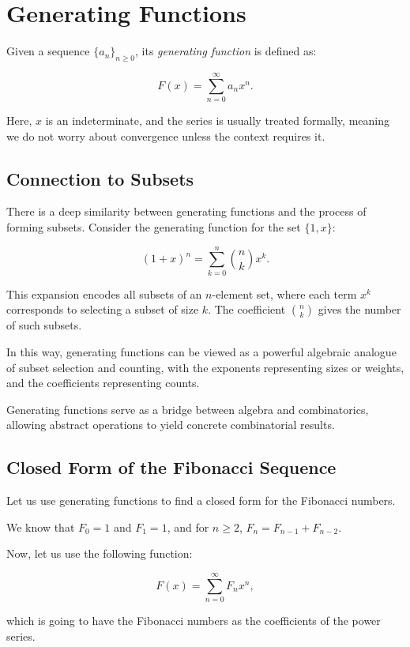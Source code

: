 \chapter{Generating Functions}

Given a sequence \( {\{a_n\}}_{n \ge 0} \), its \emph{generating function} is defined as:

\[
    F(x) = \sum_{n=0}^{\infty} a_n x^n.
\]

Here, \(x\) is an indeterminate, and the series is usually treated formally, meaning we do not 
worry about convergence unless the context requires it.

\section{Connection to Subsets}

There is a deep similarity between generating functions and the process of forming subsets. Consider the 
generating function for the set \( \{1, x\} \):

\[
    (1 + x)^n = \sum_{k=0}^n \binom{n}{k} x^k.
\]

This expansion encodes all subsets of an \(n\)-element set, where each term \( x^k \) corresponds to 
selecting a subset of size \(k\). The coefficient \( \binom{n}{k} \) gives the number of such subsets.

In this way, generating functions can be viewed as a powerful algebraic analogue of subset selection and 
counting, with the exponents representing sizes or weights, and the coefficients representing counts.

Generating functions serve as a bridge between algebra and combinatorics, allowing abstract operations to 
yield concrete combinatorial results.

\section{Closed Form of the Fibonacci Sequence}

Let us use generating functions to find a closed form for the Fibonacci numbers.

We know that \(F_0 = 1\) and \(F_1 = 1\), and for \(n \ge 2\), \(F_n = F_{n-1} + F_{n-2}\).

Now, let us use the following function:

\[
    F(x) = \sum_{n = 0}^{\infty} F_n x^{n},
\]

which is going to have the Fibonacci numbers as the coefficients of the power series.

